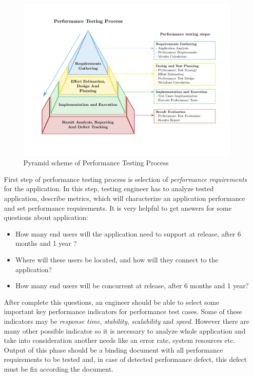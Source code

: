 \begin{figure}[H]
  \centering
  \includegraphics[width=16cm]{obrazky-figures/pyramid.pdf}
  \caption{Pyramid scheme of Performance Testing Process}
  \label{fig:performace_testing_process}
\end{figure}

First step of performance testing process is selection of \emph{performance requirements} for the application. In this step, testing engineer has to analyze tested application, describe metrics, which will characterize an application performance and set performance requirements. It is very helpful to get answers for some questions about application:

\begin{itemize}
	\setlength\itemsep{0em}
	\item How many end users will the application need to support at release, after 6 months and 1 year ?
	\item Where will these users be located, and how will they connect to the application?
	\item How many end users will be concurrent at release, after 6 months and 1 year?
\end{itemize}

After complete this questions, an engineer should be able to select some important key performance indicators for performance test cases. Some of these indicators may be \emph{response time}, \emph{stability}, \emph{scalability} and \emph{speed}. However there are many other possible indicator so it is necessary to analyze whole application and take into consideration another needs like an error rate, system resources etc.  Output of this phase should be a binding document with all performance requirements to be tested and, in case of detected performance defect, this defect must be fix according the document.

